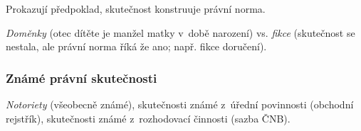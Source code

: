 Prokazují předpoklad, skutečnost konstruuje právní norma.

\emph{Doměnky} (otec dítěte je manžel matky v~době narození) vs. \emph{fikce} (skutečnost se nestala, ale právní norma říká že ano; např. fikce doručení).


\subsubsection{Známé právní skutečnosti}

\emph{Notoriety} (všeobecně známé), skutečnosti známé z~úřední povinnosti (obchodní rejstřík), skutečnosti známé z~rozhodovací činnosti (sazba ČNB).
